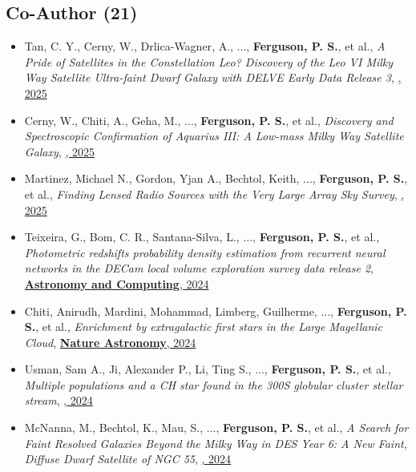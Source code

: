 \subsection{Co-Author  (21)}
\begin{itemize}[itemsep=1pt]
    \item {Tan}, C. Y., {Cerny}, W., {Drlica-Wagner}, A., ..., \textbf{Ferguson, P. S.}, et al., \textit{{A Pride of Satellites in the Constellation Leo? Discovery of the Leo VI Milky Way Satellite Ultra-faint Dwarf Galaxy with DELVE Early Data Release 3}}, \href{https://ui.adsabs.harvard.edu/abs/2025ApJ...979..176T}{\textbf{\apj}, 2025}
    \item {Cerny}, W., {Chiti}, A., {Geha}, M., ..., \textbf{Ferguson, P. S.}, et al., \textit{{Discovery and Spectroscopic Confirmation of Aquarius III: A Low-mass Milky Way Satellite Galaxy}}, \href{https://ui.adsabs.harvard.edu/abs/2025ApJ...979..164C}{\textbf{\apj}, 2025}
    \item {Martinez}, Michael N., {Gordon}, Yjan A., {Bechtol}, Keith, ..., \textbf{Ferguson, P. S.}, et al., \textit{{Finding Lensed Radio Sources with the Very Large Array Sky Survey}}, \href{https://ui.adsabs.harvard.edu/abs/2025ApJ...979..132M}{\textbf{\apj}, 2025}
    \item {Teixeira}, G., {Bom}, C. R., {Santana-Silva}, L., ..., \textbf{Ferguson, P. S.}, et al., \textit{{Photometric redshifts probability density estimation from recurrent neural networks in the DECam local volume exploration survey data release 2}}, \href{https://ui.adsabs.harvard.edu/abs/2024A&C....4900886T}{\textbf{Astronomy and Computing}, 2024}
    \item {Chiti}, Anirudh, {Mardini}, Mohammad, {Limberg}, Guilherme, ..., \textbf{Ferguson, P. S.}, et al., \textit{{Enrichment by extragalactic first stars in the Large Magellanic Cloud}}, \href{https://ui.adsabs.harvard.edu/abs/2024NatAs...8..637C}{\textbf{Nature Astronomy}, 2024}
    \item {Usman}, Sam A., {Ji}, Alexander P., {Li}, Ting S., ..., \textbf{Ferguson, P. S.}, et al., \textit{{Multiple populations and a CH star found in the 300S globular cluster stellar stream}}, \href{https://ui.adsabs.harvard.edu/abs/2024MNRAS.529.2413U}{\textbf{\mnras}, 2024}
    \item {McNanna}, M., {Bechtol}, K., {Mau}, S., ..., \textbf{Ferguson, P. S.}, et al., \textit{{A Search for Faint Resolved Galaxies Beyond the Milky Way in DES Year 6: A New Faint, Diffuse Dwarf Satellite of NGC 55}}, \href{https://ui.adsabs.harvard.edu/abs/2024ApJ...961..126M}{\textbf{\apj}, 2024}

\end{itemize}

